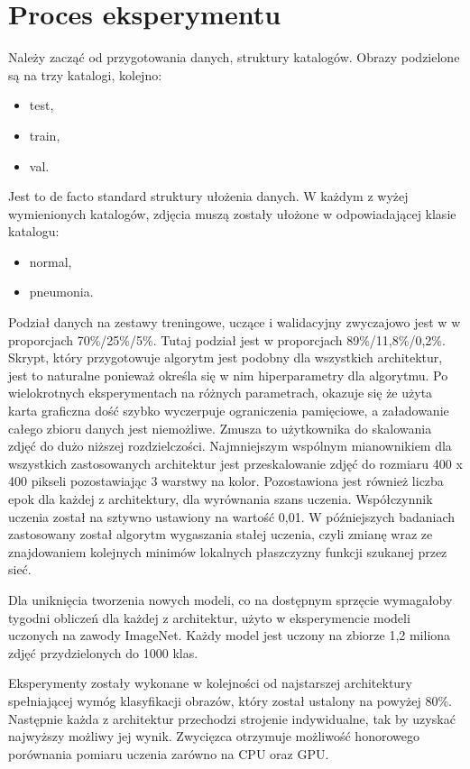\documentclass[12pt,a4paper,twoside,titlepage,openright]{book}
\begin{document}
\section{Proces eksperymentu}
Należy zacząć od przygotowania danych, struktury katalogów. Obrazy podzielone są na trzy katalogi, kolejno:
\begin{itemize}
\item test,
\item train,
\item val.
\end{itemize}

Jest to de facto standard struktury ułożenia danych. W każdym z wyżej wymienionych katalogów, zdjęcia muszą zostały ułożone w odpowiadającej klasie katalogu:
\begin{itemize}
\item normal,
\item pneumonia.
\end{itemize}

Podział danych na zestawy treningowe, uczące i walidacyjny zwyczajowo jest w w proporcjach 70\%/25\%/5\%. Tutaj podział jest w proporcjach 89\%/11,8\%/0,2\%.
Skrypt, który przygotowuje algorytm jest podobny dla wszystkich architektur, jest to naturalne ponieważ określa się w nim hiperparametry dla algorytmu. Po wielokrotnych eksperymentach na różnych parametrach, okazuje się że użyta karta graficzna dość szybko wyczerpuje ograniczenia pamięciowe, a załadowanie całego zbioru danych jest niemożliwe. Zmusza to użytkownika do skalowania zdjęć do dużo niższej rozdzielczości. Najmniejszym wspólnym mianownikiem dla wszystkich zastosowanych architektur jest przeskalowanie zdjęć do rozmiaru 400 x 400 pikseli pozostawiając 3 warstwy na kolor. Pozostawiona jest również liczba epok dla każdej z architektury, dla wyrównania szans uczenia. Współczynnik uczenia został na sztywno ustawiony na wartość 0,01. W późniejszych badaniach zastosowany został algorytm wygaszania stałej uczenia, czyli zmianę wraz ze znajdowaniem kolejnych minimów lokalnych płaszczyzny funkcji szukanej przez sieć.

Dla uniknięcia tworzenia nowych modeli, co na dostępnym sprzęcie wymagałoby tygodni obliczeń dla każdej z architektur, użyto w eksperymencie modeli uczonych na zawody ImageNet. Każdy model jest uczony na zbiorze 1,2 miliona zdjęć przydzielonych do 1000 klas. 

Eksperymenty zostały wykonane w kolejności od najstarszej architektury spełniającej wymóg klasyfikacji obrazów, który został ustalony na powyżej 80\%. Następnie każda z architektur przechodzi strojenie indywidualne, tak by uzyskać najwyższy możliwy jej wynik. Zwycięzca otrzymuje możliwość honorowego porównania pomiaru uczenia zarówno na CPU oraz GPU.
\end{document}
